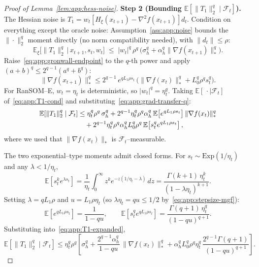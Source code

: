 \documentclass[10pt,a4paper]{amsart}
\begin{document}
\begin{proof}[Proof of Lemma~\ref{lem:app:hess-noise}]
\smallskip\noindent\textbf{Step 2 (Bounding $\mathbb{E}[\|T_1\|_2^q \mid \mathcal{F}_t]$).}
The Hessian noise is $T_1 = w_t [H_\xi(x_{t+1}) - \nabla^2 f(x_{t+1})]
d_t$. Condition on everything except the oracle noise:
Assumption~\ref{ass:app:noise} bounds the $\|\cdot\|_2^q$ moment
directly (no norm compatibility needed), with $\|d_t\| \leq \rho$:
\begin{equation}
  \mathbb{E}_\xi\bigl[\|T_1\|_2^q \,\big|\, x_{t+1}, s_t, w_t\bigr]
  \;\leq\; |w_t|^q\, \rho^q\,
    \bigl(\sigma_h^q + \alpha_h^q \|\nabla f(x_{t+1})\|_*^q\bigr).
  \label{eq:app:T1-cond}
\end{equation}
Raise~\eqref{eq:app:gronwall-endpoint} to the $q$-th power and apply
$(a+b)^q \leq 2^{q-1}(a^q + b^q)$:
\begin{equation}
  \|\nabla f(x_{t+1})\|_*^q
  \leq 2^{q-1}\, e^{q L_1 \rho s_t}\,
    \bigl(\|\nabla f(x_t)\|_*^q + L_0^q \rho^q s_t^q\bigr).
  \label{eq:app:grad-transfer-q}
\end{equation}
For RanSOM--E, $w_t = \eta_t$ is deterministic, so $|w_t|^q = \eta_t^q$.
Taking $\mathbb{E}[\,\cdot \mid \mathcal{F}_t]$ of~\eqref{eq:app:T1-cond}
and substituting~\eqref{eq:app:grad-transfer-q}:
\begin{align}
  \mathbb{E}[\|T_1\|_2^q \mid \mathcal{F}_t]
  &\leq \eta_t^q\rho^q\,\sigma_h^q
    + 2^{q-1}\eta_t^q \rho^q\alpha_h^q\,
      \mathbb{E}\!\left[e^{qL_1\rho s_t}\right] \|\nabla f(x_t)\|_*^q
  \notag \\
  &\quad + 2^{q-1}\eta_t^q \rho^q\alpha_h^q L_0^q \rho^q\,
      \mathbb{E}\!\left[s_t^q e^{qL_1\rho s_t}\right],
  \label{eq:app:T1-expanded}
\end{align}
where we used that $\|\nabla f(x_t)\|_*$ is $\mathcal{F}_t$--measurable.

The two exponential--type moments admit closed forms. For $s_t \sim
\mathrm{Exp}(1/\eta_t)$ and any $\lambda < 1/\eta_t$,
\begin{equation}
  \mathbb{E}\!\left[s_t^k e^{\lambda s_t}\right]
  = \frac{1}{\eta_t}\int_0^\infty z^k e^{-z(1/\eta_t - \lambda)}\,dz
  = \frac{\Gamma(k+1)\,\eta_t^k}{(1 - \lambda \eta_t)^{k+1}}.
  \label{eq:app:exp-moment}
\end{equation}
Setting $\lambda = qL_1\rho$ and $u = L_1\rho\eta_t$ (so $\lambda\eta_t =
qu \leq 1/2$ by~\eqref{eq:app:stepsize-mgf}):
\begin{equation}
  \mathbb{E}[e^{qL_1\rho s_t}] = \frac{1}{1 - qu}, \qquad
  \mathbb{E}[s_t^q e^{qL_1\rho s_t}]
    = \frac{\Gamma(q+1)\, \eta_t^q}{(1 - qu)^{q+1}}.
  \label{eq:app:exp-mgf}
\end{equation}
Substituting into~\eqref{eq:app:T1-expanded},
\begin{equation}
  \mathbb{E}[\|T_1\|_2^q \mid \mathcal{F}_t]
  \leq \eta_t^q \rho^q \!\left[\sigma_h^q
    + \frac{2^{q-1}\alpha_h^q}{1 - qu}\, \|\nabla f(x_t)\|_*^q
    + \alpha_h^q L_0^q \rho^q \eta_t^q\,
      \frac{2^{q-1}\Gamma(q+1)}{(1-qu)^{q+1}}\right].
  \label{eq:app:T1-final}
\end{equation}


\end{proof}
\end{document}
